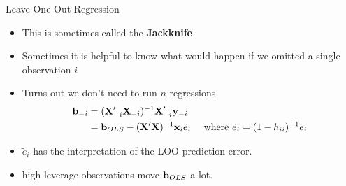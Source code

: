 \documentclass[aspectratio=169,11pt]{beamer}
\begin{document}
\begin{frame}{Leave One Out Regression}
\begin{itemize}
\item This is sometimes called the {\bf Jackknife}
\item Sometimes it is helpful to know what would happen if we omitted a single observation $i$
\item Turns out we don't need to run $n$ regressions
\begin{align*}
{\bf b}_{-i} &= ({\bf X}_{-i}'{\bf X}_{-i})^{-1} {\bf X}_{-i}' {\bf y}_{-i} \\
&={\bf b}_{OLS} -  ({\bf X} '{\bf X})^{-1} {\bf x}_i  \tilde{e}_i  \quad \mbox{ where } \tilde{e}_i = (1-h_{ii})^{-1} e_i
\end{align*}
\item $\tilde{e}_i $ has the interpretation of the LOO prediction error.
\item high leverage observations move ${\bf b}_{OLS}$ a lot.
\end{itemize}
\end{frame}




\end{document}

